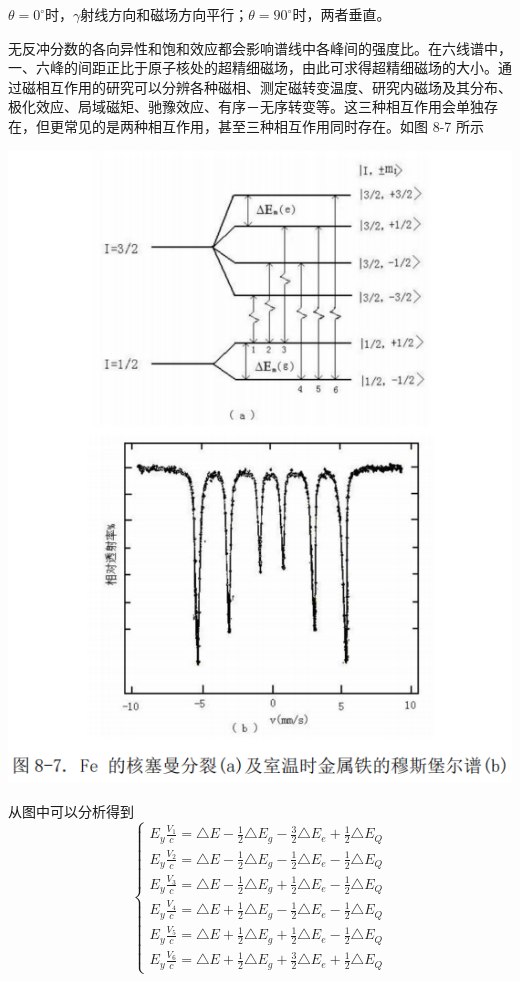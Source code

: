 \documentclass[hyperref]{ctexart}
\begin{document}
\begin{multicols}{2}
	$\theta = 0^{\circ}$时，$\gamma$射线方向和磁场方向平行；$\theta = 90^{\circ}$时，两者垂直。

	无反冲分数的各向异性和饱和效应都会影响谱线中各峰间的强度比。在六线谱中，一、六峰的间距正比于原子核处的超精细磁场，由此可求得超精细磁场的大小。通过磁相互作用的研究可以分辨各种磁相、测定磁转变温度、研究内磁场及其分布、极化效应、局域磁矩、驰豫效应、有序－无序转变等。这三种相互作用会单独存在，但更常见的是两种相互作用，甚至三种相互作用同时存在。如图 8-7 所示

	\begin{center}\includegraphics[scale=0.3]{t87.png}\end{center}
	从图中可以分析得到
	\begin{equation}
	\begin{cases}
	E_y\frac{V_1}{c}=\triangle E-\frac 1 2\triangle E_g-\frac 3 2\triangle E_e+\frac 1 2\triangle E_Q \\
	E_y\frac{V_2}{c}=\triangle E-\frac 1 2\triangle E_g-\frac 1 2\triangle E_e-\frac 1 2\triangle E_Q \\
	E_y\frac{V_3}{c}=\triangle E-\frac 1 2\triangle E_g+\frac 1 2\triangle E_e-\frac 1 2\triangle E_Q \\
	E_y\frac{V_4}{c}=\triangle E+\frac 1 2\triangle E_g-\frac 1 2\triangle E_e-\frac 1 2\triangle E_Q \\
	E_y\frac{V_5}{c}=\triangle E+\frac 1 2\triangle E_g+\frac 1 2\triangle E_e-\frac 1 2\triangle E_Q \\
	E_y\frac{V_6}{c}=\triangle E+\frac 1 2\triangle E_g+\frac 3 2\triangle E_e+\frac 1 2\triangle E_Q 
	\end{cases}\label{haochang}
	\end{equation}


\end{multicols}
\end{document}
